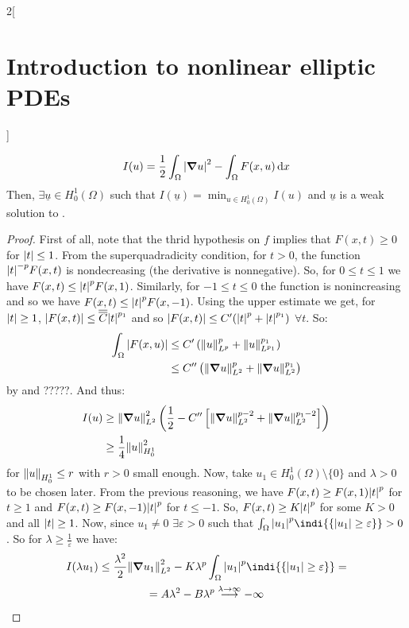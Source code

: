 \documentclass[../../../main_math.tex]{subfiles}
\begin{document}
\begin{multicols}{2}[\section{Introduction to nonlinear elliptic PDEs}]
\begin{proposition}
    $$
      I(u)=\frac{1}{2}\int_\Omega \abs{\grad u}^2-\int_\Omega F(x,u)\dd{x}
    $$
    Then, $\exists \underline{u}\in H_0^1(\Omega)$ such that $I(\underline{u})=\displaystyle \min_{u\in H_0^1(\Omega)}I(u)$ and $\underline{u}$ is a weak solution to .
  \end{proposition}
  \begin{proof}
    First of all, note that the thrid hypothesis on $f$ implies that $F(x,t)\geq 0$ for $\abs{t}\leq 1$. From the superquadradicity condition, for $t>0$, the function $\abs{t}^{-p}F(x,t)$ is nondecreasing (the derivative is nonnegative). So, for $0\leq t\leq 1$ we have $F(x,t)\leq \abs{t}^p F(x,1)$. Similarly, for $-1\leq t\leq 0$ the function is nonincreasing and so we have $F(x,t)\leq \abs{t}^p F(x,-1)$. Using the upper estimate we get, for $\abs{t}\geq 1$, $\abs{F(x,t)}\leq \overline{\overline{C}} \abs{t}^{p_1}$ and so
    $\abs{F(x,t)}\leq C'(\abs{t}^p+\abs{t}^{p_1})$ $\forall t$. So:
    \begin{align*}
      \int_\Omega \abs{F(x,u)} & \leq C'\left(\norm{u}_{L^{p}}^p+\norm{u}_{L^{p_1}}^{p_1}\right)        \\
                               & \leq C''\left(\norm{\grad u}_{L^2}^p+\norm{\grad u}_{L^2}^{p_1}\right)
    \end{align*}
    by  and ?????. And thus:
    \begin{align}
      I(u) & \geq \norm{\grad u}_{L^2}^2\left(\frac{1}{2}-C''\left[\norm{\grad u}_{L^2}^{p-2}+\norm{\grad u}_{L^2}^{p_1-2}\right]\right)\nonumber \\
           & \label{INEPDE:I_mountain}\geq \frac{1}{4}\norm{u}_{H_0^1}^2
    \end{align}
    for $\norm{u}_{H_0^1}\leq r$ with $r>0$ small enough. Now, take $u_1\in H_0^1(\Omega)\setminus\{0\}$ and $\lambda>0$ to be chosen later. From the previous reasoning, we have $F(x,t)\geq F(x,1)\abs{t}^{p}$ for $t\geq 1$ and $F(x,t)\geq F(x,-1)\abs{t}^{p}$ for $t\leq -1$. So, $F(x,t)\geq K\abs{t}^{p}$ for some $K>0$ and all $\abs{t} \geq 1$. Now, since $u_1\ne 0$ $\exists \varepsilon>0$ such that $\int_\Omega \abs{u_1}^p\indi{\{\abs{u_1}\geq \varepsilon\}}>0$. So for $\lambda\geq \frac{1}{\varepsilon}$ we have:
    \begin{multline*}
      I(\lambda u_1) \leq \frac{\lambda^2}{2}\norm{\grad u_1}_{L^2}^2-K\lambda^p\int_\Omega \abs{u_1}^p\indi{\{\abs{u_1}\geq \varepsilon\}}=\\=A\lambda^2-B\lambda^p\overset{\lambda\to\infty}{\longrightarrow} -\infty

\end{multline*}
\end{proof}
\end{multicols}
\end{document}
